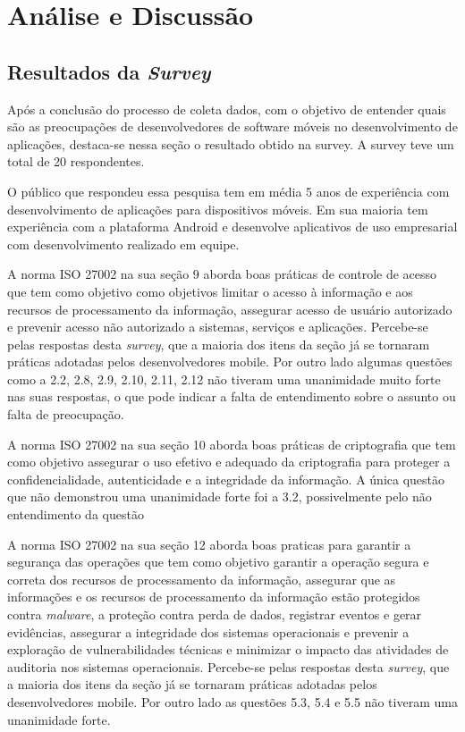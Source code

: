 \chapter{\label{chap:intro}Análise e Discussão}
 




\section{Resultados da \textit{Survey}}

Após a conclusão do processo de coleta dados, com o objetivo de entender quais são as preocupações de desenvolvedores de software móveis no desenvolvimento de aplicações, destaca-se nessa seção o resultado obtido na survey. A survey teve um total de 20 respondentes.

O público que respondeu essa pesquisa tem em média 5 anos de experiência com desenvolvimento de aplicações  para dispositivos móveis. Em sua maioria tem experiência com a plataforma Android e desenvolve aplicativos de uso empresarial com desenvolvimento realizado em equipe.

A norma ISO 27002 na sua seção 9 aborda boas práticas de controle de acesso que tem como objetivo como objetivos limitar o acesso à informação e aos recursos de processamento da informação, assegurar acesso de usuário autorizado e prevenir acesso não autorizado a sistemas, serviços e aplicações. Percebe-se pelas respostas desta \textit{survey}, que a maioria dos itens da seção já se tornaram práticas adotadas pelos desenvolvedores mobile. Por outro lado algumas questões como a 2.2, 2.8, 2.9, 2.10, 2.11, 2.12 não tiveram uma unanimidade muito forte nas suas respostas, o que pode indicar a falta de entendimento sobre o assunto ou falta de preocupação. 

A norma ISO 27002 na sua seção 10 aborda boas práticas de criptografia que tem como objetivo assegurar o uso efetivo e adequado da criptografia para proteger a confidencialidade, autenticidade e a integridade da informação. A única questão que não demonstrou uma unanimidade forte foi a 3.2, possivelmente pelo não entendimento da questão

A norma ISO 27002 na sua seção 12 aborda boas praticas para garantir a segurança das operações que tem como objetivo garantir a operação segura e correta dos recursos de processamento da informação, assegurar que as informações e os recursos de processamento da informação estão protegidos contra \textit{malware}, a proteção contra perda de dados, registrar eventos e gerar evidências, assegurar a integridade dos sistemas operacionais e prevenir a exploração de vulnerabilidades técnicas e minimizar o impacto das atividades de auditoria nos sistemas operacionais. Percebe-se pelas respostas desta \textit{survey}, que a maioria dos itens da seção já se tornaram práticas adotadas pelos desenvolvedores mobile.  Por outro lado as questões 5.3, 5.4 e 5.5 não tiveram uma unanimidade forte.


